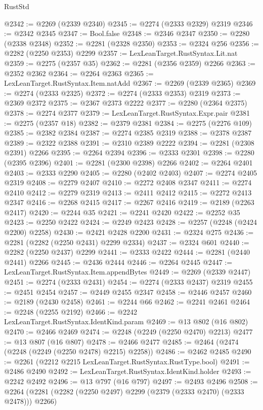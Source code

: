 \begin{lexlean}{RustStd}
\begin{coremodule}
@2342 := @2269 (@2339 @2340)
@2345 := @2274 (@2333 @2329) @2319
@2346 := @2342 @2345
@2347 := Bool.false
@2348 := @2346 @2347
@2350 := @2280 (@2338 @2348)
@2352 := @2281 (@2328 @2350)
@2353 := @2324 @256
@2356 := @2282 (@2250 @2353) @2299
@2357 := LexLeanTarget.RustSyntax.Lit.nat
@2359 := @2275 (@2357 @35)
@2362 := @2281 (@2356 @2359) @2266
@2363 := @2352 @2362
@2364 := @2264 @2363
@2365 := LexLeanTarget.RustSyntax.Item.natAdd
@2367 := @2269 (@2339 @2365)
@2369 := @2274 (@2333 @2325)
@2372 := @2274 (@2333 @2353) @2319
@2373 := @2369 @2372
@2375 := @2367 @2373 @2222
@2377 := @2280 (@2364 @2375)
@2378 := @2274 @2377
@2379 := LexLeanTarget.RustSyntax.Expr.pair
@2381 := @2275 (@2357 @18)
@2382 := @2379 @2381
@2384 := @2275 (@2276 @109)
@2385 := @2382 @2384
@2387 := @2274 @2385 @2319
@2388 := @2378 @2387
@2389 := @2322 @2388
@2391 := @2310 @2389 @2222
@2394 := @2281 (@2308 @2391) @2266
@2395 := @2264 @2394
@2396 := @2333 @2301
@2398 := @2280 (@2395 @2396)
@2401 := @2281 (@2300 @2398) @2266
@2402 := @2264 @2401
@2403 := @2333 @2290
@2405 := @2280 (@2402 @2403)
@2407 := @2274 @2405 @2319
@2408 := @2279 @2407
@2410 := @2272 @2408 @2347
@2411 := @2274 @2410
@2412 := @2279 @2319
@2413 := @2411 @2412
@2415 := @2272 @2413 @2347
@2416 := @2268 @2415
@2417 := @2267 @2416
@2419 := @2189 (@2263 @2417)
@2420 := @2244 @35
@2421 := @2241 @2420
@2422 := @2252 @35
@2423 := @2250 @2422
@2424 := @2249 @2423
@2428 := @2257 (@2248 (@2424 @2200) @2258)
@2430 := @2421 @2428 @2200
@2431 := @2324 @275
@2436 := @2281 (@2282 (@2250 @2431) @2299 @2334)
@2437 := @2324 @601
@2440 := @2282 (@2250 @2437) @2299
@2441 := @2333 @2422
@2444 := @2281 (@2440 @2441) @2266
@2445 := @2436 @2444
@2446 := @2264 @2445
@2447 := LexLeanTarget.RustSyntax.Item.appendBytes
@2449 := @2269 (@2339 @2447)
@2451 := @2274 (@2333 @2431)
@2454 := @2274 (@2333 @2437) @2319
@2455 := @2451 @2454
@2457 := @2449 @2455 @2347
@2458 := @2446 @2457
@2460 := @2189 (@2430 @2458)
@2461 := @2244 @66
@2462 := @2241 @2461
@2464 := @2248 (@2255 @2192)
@2466 := @2242 LexLeanTarget.RustSyntax.IdentKind.param
@2469 := @13 @802 (@16 @802)
@2470 := @2466 @2469
@2474 := @2248 (@2249 (@2250 @2470) @2213)
@2477 := @13 @807 (@16 @807)
@2478 := @2466 @2477
@2485 := @2464 (@2474 (@2248 (@2249 (@2250 @2478) @2215) @2258))
@2486 := @2462 @2485
@2490 := @2261 (@2212 @2215 LexLeanTarget.RustSyntax.RustType.bool)
@2491 := @2486 @2490
@2492 := LexLeanTarget.RustSyntax.IdentKind.holder
@2493 := @2242 @2492
@2496 := @13 @797 (@16 @797)
@2497 := @2493 @2496
@2508 := @2264 (@2281 (@2282 (@2250 @2497) @2299 (@2379 (@2333 @2470) (@2333 @2478))) @2266)

\end{coremodule}
\end{lexlean}

